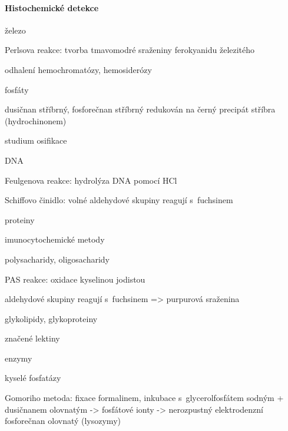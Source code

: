 \documentclass[DIV=8]{scrreprt}
\begin{document}
\paragraph{Histochemické detekce}
\begin{myItemize}[nosep]
    \item železo
\begin{myItemize}[nosep]
    \item Perlsova reakce: tvorba tmavomodré sraženiny ferokyanidu železitého
    \item odhalení hemochromatózy, hemosiderózy
\end{myItemize}

    \item fosfáty
\begin{myItemize}[nosep]
    \item dusičnan stříbrný, fosforečnan stříbrný redukován na černý precipát stříbra (hydrochinonem)
    \item studium osifikace
\end{myItemize}

    \item DNA
\begin{myItemize}[nosep]
    \item Feulgenova reakce: hydrolýza DNA pomocí HCl
    \item Schiffovo činidlo: volné aldehydové skupiny reagují s fuchsinem
\end{myItemize}

    \item proteiny
\begin{myItemize}[nosep]
    \item imunocytochemické metody
    \item polysacharidy, oligosacharidy
\begin{myItemize}[nosep]
    \item PAS reakce: oxidace kyselinou jodistou
    \item aldehydové skupiny reagují s fuchsinem => purpurová sraženina
\end{myItemize}

    \item glykolipidy, glykoproteiny
\begin{myItemize}[nosep]
    \item značené lektiny
\end{myItemize}

\end{myItemize}

    \item enzymy
\begin{myItemize}[nosep]
    \item kyselé fosfatázy
\begin{myItemize}[nosep]
    \item Gomoriho metoda: fixace formalinem, inkubace s glycerolfosfátem sodným + dusičnanem olovnatým -> fosfátové ionty -> nerozpustný elektrodenzní fosforečnan olovnatý (lysozymy)
\end{myItemize}


\end{myItemize}
\end{myItemize}
\end{document}
